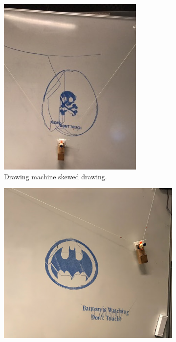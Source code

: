 \begin{figure}[H]
    \caption{Configuring bridging between drawing machine and logic}
    \begin{subfigure}[t]{.24\textwidth}
        \includegraphics[width=\textwidth]{Images/DrawingMachine/SkewedDrawing.jpg}
        \caption{Drawing machine skewed drawing.}
        \label{SkewedDrawing}
        \centering
    \end{subfigure}
    \begin{subfigure}[t]{.24\textwidth}
        \includegraphics[width=\textwidth]{Images/Jacobselskovsbilleder/Batman.PNG}

\end{subfigure}
\end{figure}
